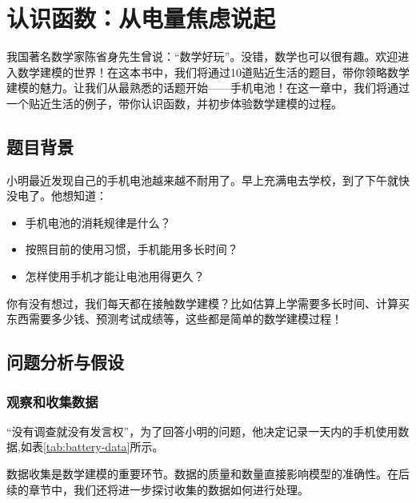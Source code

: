 
 \chapter{认识函数：从电量焦虑说起}\label{chap:battery-modeling}

我国著名数学家陈省身先生曾说：“数学好玩”。没错，数学也可以很有趣。欢迎进入数学建模的世界！在这本书中，我们将通过10道贴近生活的题目，带你领略数学建模的魅力。让我们从最熟悉的话题开始——手机电池！在这一章中，我们将通过一个贴近生活的例子，带你认识函数，并初步体验数学建模的过程。

\section{题目背景}\label{sec:problem-background}

小明最近发现自己的手机电池越来越不耐用了。早上充满电去学校，到了下午就快没电了。他想知道：
\begin{itemize}
    \item 手机电池的消耗规律是什么？
    \item 按照目前的使用习惯，手机能用多长时间？
    \item 怎样使用手机才能让电池用得更久？
\end{itemize}

\begin{infobox}[title=生活中的数学]
你有没有想过，我们每天都在接触数学建模？比如估算上学需要多长时间、计算买东西需要多少钱、预测考试成绩等，这些都是简单的数学建模过程！
\end{infobox}

\section{问题分析与假设}\label{sec:problem-analysis}

\subsection{观察和收集数据}

“没有调查就没有发言权”，为了回答小明的问题，他决定记录一天内的手机使用数据,如表\ref{tab:battery-data}所示。

\begin{warningbox}[title=数据收集]
数据收集是数学建模的重要环节。数据的质量和数量直接影响模型的准确性。在后续的章节中，我们还将进一步探讨收集的数据如何进行处理。
\end{warningbox}

